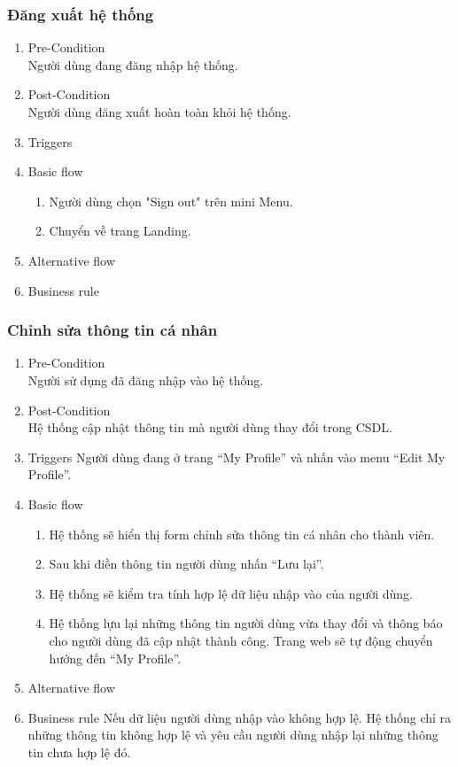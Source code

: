 \subsubsection{Đăng xuất hệ thống}
\begin{enumerate}
	\item Pre-Condition\\
	Người dùng đang đăng nhập hệ thống.
	\item Post-Condition\\
	Người dùng đăng xuất hoàn toàn khỏi hệ thống.
	\item Triggers
	\item Basic flow
	\begin{enumerate}
		\item Người dùng chọn "Sign out" trên mini Menu.
		\item Chuyển về trang Landing.
	\end{enumerate}
	\item Alternative flow
	\item Business rule
\end{enumerate}

\subsubsection{Chỉnh sửa thông tin cá nhân}
\begin{enumerate}
	\item Pre-Condition\\
	Người sử dụng đã đăng nhập vào hệ thống.
	\item Post-Condition\\
	Hệ thống cập nhật thông tin mà người dùng thay đổi trong CSDL.
	\item Triggers
	Người dùng đang ở trang “My Profile” và nhấn vào menu “Edit My Profile”.
	\item Basic flow
	\begin{enumerate}
		\item Hệ thống sẽ hiển thị form chỉnh sửa thông tin cá nhân cho thành viên.
		\item Sau khi điền thông tin người dùng nhấn “Lưu lại”.
		\item Hệ thống sẽ kiểm tra tính hợp lệ dữ liệu nhập vào của người dùng. 
		\item Hệ thống lựu lại những thông tin người dùng vừa thay đổi và thông báo cho người dùng đã cập nhật thành công. Trang web sẽ tự động chuyển hướng đến “My Profile”.
	\end{enumerate}
	\item Alternative flow
	\item Business rule
	Nếu dữ liệu người dùng nhập vào không hợp lệ. Hệ thống chỉ ra những thông tin không hợp lệ và yêu cầu người dùng nhập lại những thông tin chưa hợp lệ đó.
\end{enumerate}

